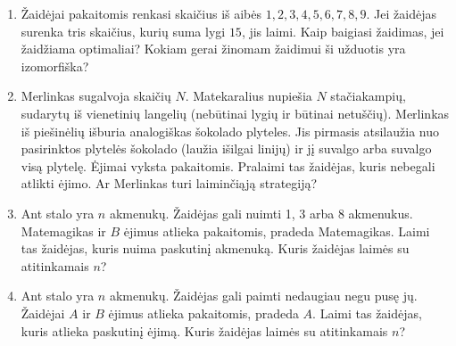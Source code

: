 \begin{enumerate}
\item Žaidėjai pakaitomis renkasi skaičius iš aibės ${1, 2, 3, 4, 5, 6, 7,
  8, 9}$. Jei žaidėjas surenka tris skaičius, kurių suma lygi $15$, jis
  laimi.  Kaip baigiasi žaidimas, jei žaidžiama optimaliai? Kokiam gerai
  žinomam žaidimui ši užduotis yra izomorfiška?


\item Merlinkas sugalvoja skaičių $N$. Matekaralius nupiešia $N$
  stačiakampių, sudarytų iš vienetinių langelių (nebūtinai lygių ir būtinai
  netuščių). Merlinkas iš piešinėlių išburia analogiškas šokolado plyteles.
  Jis pirmasis atsilaužia nuo pasirinktos plytelės šokolado (laužia išilgai
  linijų) ir jį suvalgo arba suvalgo visą plytelę. Ėjimai vyksta
  pakaitomis. Pralaimi tas žaidėjas, kuris nebegali atlikti ėjimo.  Ar
  Merlinkas turi laiminčiąją strategiją?  


\item Ant stalo yra $n$ akmenukų. Žaidėjas gali nuimti 1, 3 arba 8
  akmenukus. Matemagikas ir $B$ ėjimus atlieka pakaitomis, pradeda
  Matemagikas.  Laimi tas žaidėjas, kuris nuima paskutinį akmenuką. Kuris
  žaidėjas laimės su atitinkamais $n$?


\item Ant stalo yra $n$ akmenukų. Žaidėjas gali paimti nedaugiau negu pusę
  jų. Žaidėjai $A$ ir $B$ ėjimus atlieka pakaitomis, pradeda $A$.  Laimi
  tas žaidėjas, kuris atlieka paskutinį ėjimą. Kuris žaidėjas laimės su
  atitinkamais $n$?



\end{enumerate}
